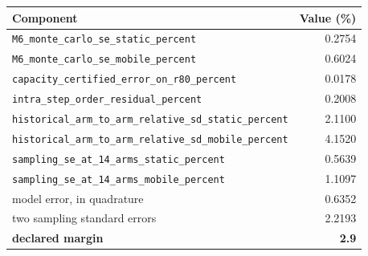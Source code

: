 \begin{center}
\small
\begin{tabular}{lr}
\toprule
Component & Value (\%) \\ \midrule
\texttt{M6\_\allowbreak{}monte\_\allowbreak{}carlo\_\allowbreak{}se\_\allowbreak{}static\_\allowbreak{}percent} & 0.2754 \\
\texttt{M6\_\allowbreak{}monte\_\allowbreak{}carlo\_\allowbreak{}se\_\allowbreak{}mobile\_\allowbreak{}percent} & 0.6024 \\
\texttt{capacity\_\allowbreak{}certified\_\allowbreak{}error\_\allowbreak{}on\_\allowbreak{}r80\_\allowbreak{}percent} & 0.0178 \\
\texttt{intra\_\allowbreak{}step\_\allowbreak{}order\_\allowbreak{}residual\_\allowbreak{}percent} & 0.2008 \\
\texttt{historical\_\allowbreak{}arm\_\allowbreak{}to\_\allowbreak{}arm\_\allowbreak{}relative\_\allowbreak{}sd\_\allowbreak{}static\_\allowbreak{}percent} & 2.1100 \\
\texttt{historical\_\allowbreak{}arm\_\allowbreak{}to\_\allowbreak{}arm\_\allowbreak{}relative\_\allowbreak{}sd\_\allowbreak{}mobile\_\allowbreak{}percent} & 4.1520 \\
\texttt{sampling\_\allowbreak{}se\_\allowbreak{}at\_\allowbreak{}14\_\allowbreak{}arms\_\allowbreak{}static\_\allowbreak{}percent} & 0.5639 \\
\texttt{sampling\_\allowbreak{}se\_\allowbreak{}at\_\allowbreak{}14\_\allowbreak{}arms\_\allowbreak{}mobile\_\allowbreak{}percent} & 1.1097 \\
\midrule
model error, in quadrature & 0.6352 \\
two sampling standard errors & 2.2193 \\
\textbf{declared margin} & \textbf{2.9} \\
\bottomrule
\end{tabular}
\end{center}
